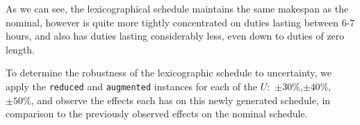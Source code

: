 \vspace{\baselineskip}
\noindent
As we can see, the lexicographical schedule maintains the same makespan as the nominal, however is quite more tightly concentrated on duties lasting between 6-7 hours, and also has duties lasting considerably less, even down to duties of zero length.

\vspace{\baselineskip}
\noindent
To determine the robustness of the lexicographic schedule to uncertainty, we apply the \texttt{reduced} and \texttt{augmented} instances for each of the $U:$ $\pm30\%$,$\pm40\%$,$\pm50\%$, and observe the effects each has on this newly generated schedule, in comparison to the previously observed effects on the nominal schedule.




